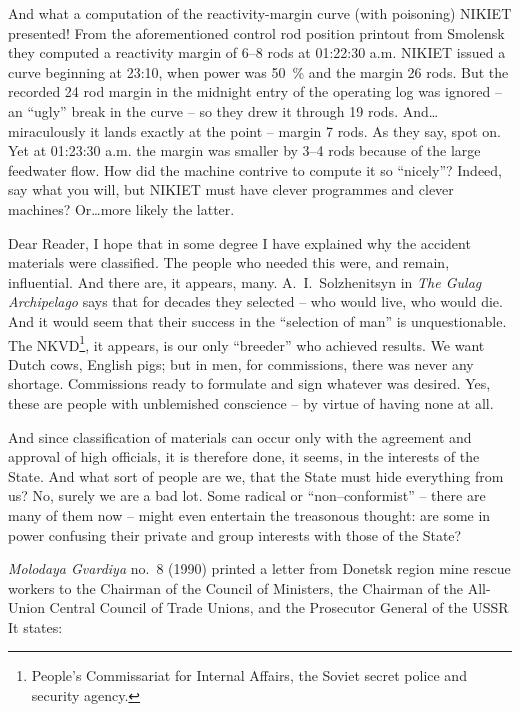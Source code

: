 \documentclass[openright]{bookest}
\begin{document}
And what a computation of the reactivity-margin curve (with poisoning) NIKIET presented! From the aforementioned control rod position printout from Smolensk they computed a reactivity margin of \numrange{6}{8} rods at 01:22:30 a.m. NIKIET issued a curve beginning at 23:10, when power was \qty{50}{\percent} and the margin \num{26} rods. But the recorded \num{24} rod margin in the midnight entry of the operating log was ignored -- an ``ugly'' break in the curve -- so they drew it through \num{19} rods. And\ldots miraculously it lands exactly at the point -- margin \num{7} rods. As they say, spot on. Yet at 01:23:30 a.m. the margin was smaller by \numrange{3}{4} rods because of the large feedwater flow. How did the machine contrive to compute it so ``nicely''? Indeed, say what you will, but NIKIET must have clever programmes and clever machines? Or\ldots more likely the latter.

Dear Reader, I hope that in some degree I have explained why the accident materials were classified. The people who needed this were, and remain, influential. And there are, it appears, many. A.~I.~Solzhenitsyn in \textit{The Gulag Archipelago} says that for decades they selected -- who would live, who would die. And it would seem that their success in the ``selection of man'' is unquestionable. The NKVD\footnote{People's Commissariat for Internal Affairs, the Soviet secret police and security agency.}, it appears, is our only ``breeder'' who achieved results. We want Dutch cows, English pigs; but in men, for commissions, there was never any shortage. Commissions ready to formulate and sign whatever was desired. Yes, these are people with unblemished conscience -- by virtue of having none at all.

And since classification of materials can occur only with the agreement and approval of high officials, it is therefore done, it seems, in the interests of the State. And what sort of people are we, that the State must hide everything from us? No, surely we are a bad lot. Some radical or ``non--conformist'' -- there are many of them now -- might even entertain the treasonous thought: are some in power confusing their private and group interests with those of the State?

\textit{Molodaya Gvardiya} no.~8 (1990) printed a letter from Donetsk region mine rescue workers to the Chairman of the Council of Ministers, the Chairman of the All-Union Central Council of Trade Unions, and the Prosecutor General of the USSR It states:
\end{document}
